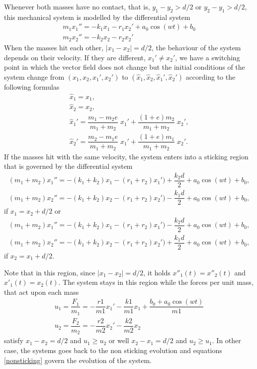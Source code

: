 \documentclass{article}
\begin{document}
\begin{description}
Whenever both masses have no contact, that is, $y_1-y_2 >d/2$
or $y_2-y_1 > d/2$,
this mechanical system is modelled by the differential system
\begin{equation}
\label{nonsticking}
\begin{array}{l}
m_1 x_1''  = -k_1 x_1 - r_1 x_2'+ a_0 \cos(w t)+b_0 \\
m_2 x_2''  = -k_2 x_2 - r_2 x_2'
\end{array}
\end{equation}
When the masses hit each other, $|x_1-x_2|=d/2$, the behaviour of the system depends
on their velocity.  If they are different, $x_1' \ne x_2'$, we have a switching point
in which the vector field does not change but the initial conditions of the system
change from $(x_1,x_2,x_1', x_2')$ to $(\hat x_1,\hat x_2,\hat x_1', \hat x_2')$
according to the following formulas
\[
\begin{array}{l}
\hat x_1= x_1, \\
 \hat x_2=x_2, \\[8pt]
\hat x_1'= \dfrac{m_1-m_2 e}{m_1+m_2}\;x_1'+\dfrac{(1+e)m_2}{m_1+m_2}\;x_2', \\[8pt]
\hat x_2'= \dfrac{m_2-m_1 e}{m_1+m_2}\; x_1'+\dfrac{(1+e)m_1}{m_1+m_2}\;x_2'.
\end{array}
\]
If the masses hit with the same velocity, the system enters
into a sticking region that is governed by the differential system
\[
\begin{array}{l}
(m_1+ m_2) x_1''  = -(k_1+k_2) x_1 - (r_1+r_2) x_1')+
\dfrac{k_2 d}{2}+ a_0 \cos(w t)+b_0,  \\[10pt]
(m_1+ m_2) x_2'' =  -(k_1+k_2) x_2 - (r_1+r_2) x_2')-
\dfrac{k_1 d}{2}+ a_0 \cos(w t)+b_0,
\end{array}
\]
if $x_1=x_2+d/2$ or
\[
\begin{array}{l}
(m_1+ m_2) x_1''  = -(k_1+k_2) x_1 - (r_1+r_2) x_1')-
\dfrac{k_2 d}{2}+ a_0 \cos(w t)+b_0,  \\[10pt]
(m_1+ m_2) x_2'' =  -(k_1+k_2) x_2 - (r_1+r_2) x_2')+
\dfrac{k_1 d}{2}+ a_0 \cos(w t)+b_0,
\end{array}
\]
if $x_2=x_1+d/2$.

Note that in this region, since $|x_1-x_2|=d/2$, it holds $x''_1(t) = x''_2(t)$
and $x'_1(t)=x_2(t)$.
The system stays in this region while the forces per unit mass, that act upon each
mass
\[
\begin{array}{l}
u_1= \dfrac{F_1}{m_1}=-\dfrac{r1}{m1} x_1'-\dfrac{k1}{m1} x_1+\dfrac{b_0+a_0 \cos(w t)}{m1} \\[10pt]
u_2= \dfrac{F_2}{m_2}=-\dfrac{r2}{m2} x_2'-\dfrac{k2}{m2} x_2
\end{array}
\]
satisfy  $x_1-x_2=d/2$ and $u_1 \ge u_2$ or well
$x_2-x_1=d/2$ and $u_2 \ge u_1$.  In other case, the systems goes back to the
non sticking evolution and equations \eqref{nonsticking} govern the evolution
of the system.


\end{description}
\end{document}
